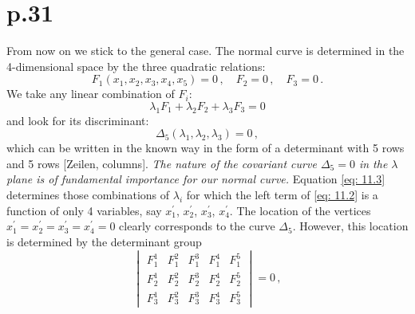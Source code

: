 \documentclass[leqno]{article}
\begin{document}
\section{p.31}
From now on we stick to the general case. The normal curve is determined in the 4-dimensional space by the three quadratic relations: 
\begin{equation}\label{eq: 11.1}
F_1(x_1, x_2, x_3, x_4, x_5) = 0 \, , \quad F_2=0 \, , \quad F_3=0 \, . \tag{1}
\end{equation}
We take any linear combination of $F_i$: 
\begin{equation}\label{eq: 11.2}
\lambda_1 F_1 + \lambda_2 F_2 + \lambda_3 F_3 = 0 \tag{2}
\end{equation} 
and look for its discriminant: 
\begin{equation}\label{eq: 11.3}
\Delta_5(\lambda_1, \lambda_2, \lambda_3) = 0 \, , \tag{3}
\end{equation} 
which can be written in the known way in the form of a determinant with 5 rows and 5 rows [Zeilen, columns]. \textit{The nature of the covariant curve $\Delta_5=0$ in the $\lambda$ plane is of fundamental importance for our normal curve.} Equation \eqref{eq: 11.3} determines those combinations of $\lambda_i$ for which the left term of \eqref{eq: 11.2} is a function of only 4 variables, say $x_1^\prime$, $x_2^\prime$, $x_3^\prime$, $x_4^\prime$. The location of the vertices $x_1^\prime = x_2^\prime = x_3^\prime = x_4^\prime=0$ clearly corresponds to the curve $\Delta_5$.
However, this location is determined by the determinant group 
\begin{equation}\label{eq: 11.4}
\begin{vmatrix}
F_1^1 & F_1^2 & F_1^3 & F_1^4 & F_1^5 \\ F_2^1 & F_2^2 & F_2^3 & F_2^4 & F_2^5 \\ F_3^1 & F_3^2 & F_3^3 & F_3^4 & F_3^5 
\end{vmatrix} = 0 \, , \tag{4}
\end{equation}
\end{document}
